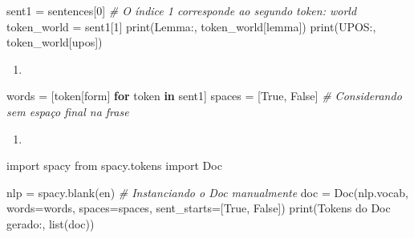 \documentclass[
  brazilian,
]{article}
\newenvironment{Shaded}{}{}
\newcommand{\BuiltInTok}[1]{#1}
\newcommand{\CommentTok}[1]{\textcolor[rgb]{0.38,0.63,0.69}{\textit{#1}}}
\newcommand{\ControlFlowTok}[1]{\textcolor[rgb]{0.00,0.44,0.13}{\textbf{#1}}}
\newcommand{\DecValTok}[1]{\textcolor[rgb]{0.25,0.63,0.44}{#1}}
\newcommand{\ImportTok}[1]{#1}
\newcommand{\KeywordTok}[1]{\textcolor[rgb]{0.00,0.44,0.13}{\textbf{#1}}}
\newcommand{\NormalTok}[1]{#1}
\newcommand{\OperatorTok}[1]{\textcolor[rgb]{0.40,0.40,0.40}{#1}}
\newcommand{\StringTok}[1]{\textcolor[rgb]{0.25,0.44,0.63}{#1}}
\newcommand{\VariableTok}[1]{\textcolor[rgb]{0.10,0.09,0.49}{#1}}
\providecommand{\tightlist}{%
  \setlength{\itemsep}{0pt}\setlength{\parskip}{0pt}}
\begin{document}
\begin{Shaded}
\begin{Highlighting}[]
\NormalTok{sent1 }\OperatorTok{=}\NormalTok{ sentences[}\DecValTok{0}\NormalTok{]}
\CommentTok{\# O índice 1 corresponde ao segundo token: \textquotesingle{}world\textquotesingle{}}
\NormalTok{token\_world }\OperatorTok{=}\NormalTok{ sent1[}\DecValTok{1}\NormalTok{]}
\BuiltInTok{print}\NormalTok{(}\StringTok{\textquotesingle{}Lemma:\textquotesingle{}}\NormalTok{, token\_world[}\StringTok{\textquotesingle{}lemma\textquotesingle{}}\NormalTok{])}
\BuiltInTok{print}\NormalTok{(}\StringTok{\textquotesingle{}UPOS:\textquotesingle{}}\NormalTok{, token\_world[}\StringTok{\textquotesingle{}upos\textquotesingle{}}\NormalTok{])}
\end{Highlighting}
\end{Shaded}

\begin{enumerate}
\def\labelenumi{\arabic{enumi}.}
\setcounter{enumi}{2}
\tightlist
\item
\end{enumerate}

\begin{Shaded}
\begin{Highlighting}[]
\NormalTok{words }\OperatorTok{=}\NormalTok{ [token[}\StringTok{\textquotesingle{}form\textquotesingle{}}\NormalTok{] }\ControlFlowTok{for}\NormalTok{ token }\KeywordTok{in}\NormalTok{ sent1]}
\NormalTok{spaces }\OperatorTok{=}\NormalTok{ [}\VariableTok{True}\NormalTok{, }\VariableTok{False}\NormalTok{] }\CommentTok{\# Considerando sem espaço final na frase}
\end{Highlighting}
\end{Shaded}

\begin{enumerate}
\def\labelenumi{\arabic{enumi}.}
\setcounter{enumi}{3}
\tightlist
\item
\end{enumerate}

\begin{Shaded}
\begin{Highlighting}[]
\ImportTok{import}\NormalTok{ spacy}
\ImportTok{from}\NormalTok{ spacy.tokens }\ImportTok{import}\NormalTok{ Doc}

\NormalTok{nlp }\OperatorTok{=}\NormalTok{ spacy.blank(}\StringTok{\textquotesingle{}en\textquotesingle{}}\NormalTok{)}
\CommentTok{\# Instanciando o Doc manualmente}
\NormalTok{doc }\OperatorTok{=}\NormalTok{ Doc(nlp.vocab, words}\OperatorTok{=}\NormalTok{words, spaces}\OperatorTok{=}\NormalTok{spaces, sent\_starts}\OperatorTok{=}\NormalTok{[}\VariableTok{True}\NormalTok{, }\VariableTok{False}\NormalTok{])}
\BuiltInTok{print}\NormalTok{(}\StringTok{\textquotesingle{}Tokens do Doc gerado:\textquotesingle{}}\NormalTok{, }\BuiltInTok{list}\NormalTok{(doc))}
\end{Highlighting}
\end{Shaded}
\end{document}
